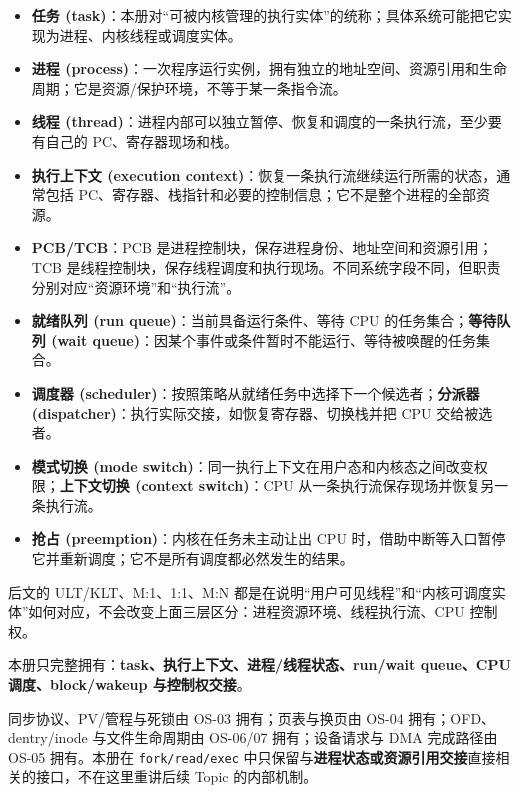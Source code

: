 \documentclass[11pt,a4paper]{ctexart}
\newcommand{\kw}[1]{\textbf{#1}}
\newcommand{\code}[1]{\texttt{#1}}
\begin{document}
\begin{method}
\begin{itemize}[leftmargin=1.5em]
  \item \kw{任务 (task)}：本册对“可被内核管理的执行实体”的统称；具体系统可能把它实现为进程、内核线程或调度实体。
  \item \kw{进程 (process)}：一次程序运行实例，拥有独立的地址空间、资源引用和生命周期；它是资源/保护环境，不等于某一条指令流。
  \item \kw{线程 (thread)}：进程内部可以独立暂停、恢复和调度的一条执行流，至少要有自己的 PC、寄存器现场和栈。
  \item \kw{执行上下文 (execution context)}：恢复一条执行流继续运行所需的状态，通常包括 PC、寄存器、栈指针和必要的控制信息；它不是整个进程的全部资源。
  \item \kw{PCB/TCB}：PCB 是进程控制块，保存进程身份、地址空间和资源引用；TCB 是线程控制块，保存线程调度和执行现场。不同系统字段不同，但职责分别对应“资源环境”和“执行流”。
  \item \kw{就绪队列 (run queue)}：当前具备运行条件、等待 CPU 的任务集合；\kw{等待队列 (wait queue)}：因某个事件或条件暂时不能运行、等待被唤醒的任务集合。
  \item \kw{调度器 (scheduler)}：按照策略从就绪任务中选择下一个候选者；\kw{分派器 (dispatcher)}：执行实际交接，如恢复寄存器、切换栈并把 CPU 交给被选者。
  \item \kw{模式切换 (mode switch)}：同一执行上下文在用户态和内核态之间改变权限；\kw{上下文切换 (context switch)}：CPU 从一条执行流保存现场并恢复另一条执行流。
  \item \kw{抢占 (preemption)}：内核在任务未主动让出 CPU 时，借助中断等入口暂停它并重新调度；它不是所有调度都必然发生的结果。
\end{itemize}
后文的 ULT/KLT、M:1、1:1、M:N 都是在说明“用户可见线程”和“内核可调度实体”如何对应，不会改变上面三层区分：进程资源环境、线程执行流、CPU 控制权。
\end{method}

\begin{method}
本册只完整拥有：\kw{task、执行上下文、进程/线程状态、run/wait queue、CPU 调度、block/wakeup 与控制权交接}。

同步协议、PV/管程与死锁由 OS-03 拥有；页表与换页由 OS-04 拥有；OFD、dentry/inode 与文件生命周期由 OS-06/07 拥有；设备请求与 DMA 完成路径由 OS-05 拥有。本册在 \code{fork/read/exec} 中只保留与\kw{进程状态或资源引用交接}直接相关的接口，不在这里重讲后续 Topic 的内部机制。
\end{method}
\end{document}
